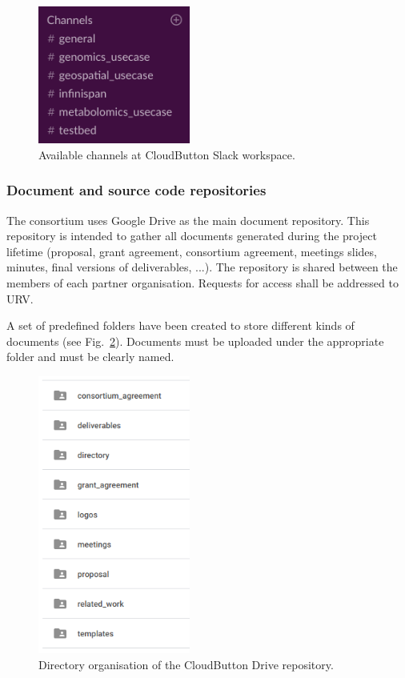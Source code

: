 \documentclass[a4paper,11pt]{article}
\begin{document}
\begin{figure}[ht]
\centering
\includegraphics[width=5cm]{figures/slack_channels.png}
\caption{Available channels at CloudButton Slack workspace.}
\label{fig:slack}
\end{figure}

\subsubsection{Document and source code repositories}

The consortium uses Google Drive as the main document repository. This repository is intended to gather all documents generated during the project lifetime (proposal, grant agreement, consortium agreement, meetings slides, minutes, final versions of deliverables, ...). The repository is shared between the members of each partner organisation. Requests for access shall be addressed to URV. 

A set of predefined folders have been created to store different kinds of documents (see Fig.~\ref{fig:drive}). Documents must be uploaded under the appropriate folder and must be clearly named. 

\begin{figure}[ht]
\centering
\includegraphics[width=5cm]{figures/drive_organisation.png}
\caption{Directory organisation of the CloudButton Drive repository.}
\label{fig:drive}
\end{figure}
\end{document}
